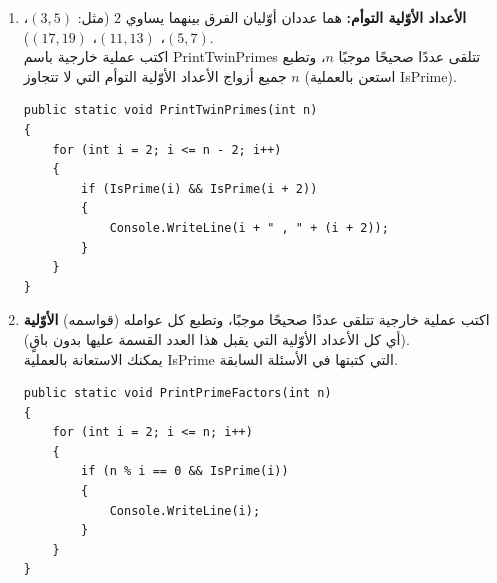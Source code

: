\documentclass[14pt]{extarticle}
\begin{document}
\begin{enumerate}[resume, itemsep=2em]
\begin{boxSolution}[فرع أ و ج]
\begin{english}
\begin{verbatim}
// c
public static void PrintPrimes(int n)
{
    for (int i = 2; i <= n; i++)
    {
        if (IsPrime(i))
        {
            Console.WriteLine(i);
        }
    }
}
\end{verbatim}
\end{english}
\end{boxSolution}

\filbreak

\begin{boxSolution}[فرع ب و د]
\begin{english}
\begin{verbatim}
public static void Main(string[] args)
{
    // b
    Console.WriteLine(IsPrime(17));
    Console.WriteLine(IsPrime(20));

    // d
    PrintPrimes(100);
}
\end{verbatim}
\end{english}
\end{boxSolution}
\fi
\filbreak

\item \textbf{الأعداد الأوّلية التوأم:} هما عددان أوّليان الفرق بينهما يساوي $2$ (مثل: $(3, 5)$، $(5, 7)$، $(11, 13)$، $(17, 19)$). \\
اكتب عملية خارجية باسم \textenglish{PrintTwinPrimes} تتلقى عددًا صحيحًا موجبًا $n$، وتطبع جميع أزواج الأعداد الأوّلية التوأم التي لا تتجاوز $n$ (استعن بالعملية \textenglish{IsPrime}).
\ifwithsols
\begin{boxSolution}
\begin{english}
\begin{verbatim}
public static void PrintTwinPrimes(int n)
{
    for (int i = 2; i <= n - 2; i++)
    {
        if (IsPrime(i) && IsPrime(i + 2))
        {
            Console.WriteLine(i + " , " + (i + 2));
        }
    }
}
\end{verbatim}
\end{english}
\end{boxSolution}
\fi
\filbreak

\item اكتب عملية خارجية تتلقى عددًا صحيحًا موجبًا، وتطبع كل عوامله (قواسمه) \textbf{الأوّلية} (أي كل الأعداد الأوّلية التي يقبل هذا العدد القسمة عليها بدون باقٍ). \\
يمكنك الاستعانة بالعملية \textenglish{IsPrime} التي كتبتها في الأسئلة السابقة.
\ifwithsols
\begin{boxSolution}
\begin{english}
\begin{verbatim}
public static void PrintPrimeFactors(int n)
{
    for (int i = 2; i <= n; i++)
    {
        if (n % i == 0 && IsPrime(i))
        {
            Console.WriteLine(i);
        }
    }
}
\end{verbatim}
\end{english}
\end{boxSolution}
\fi
\filbreak


\end{enumerate}
\end{document}
